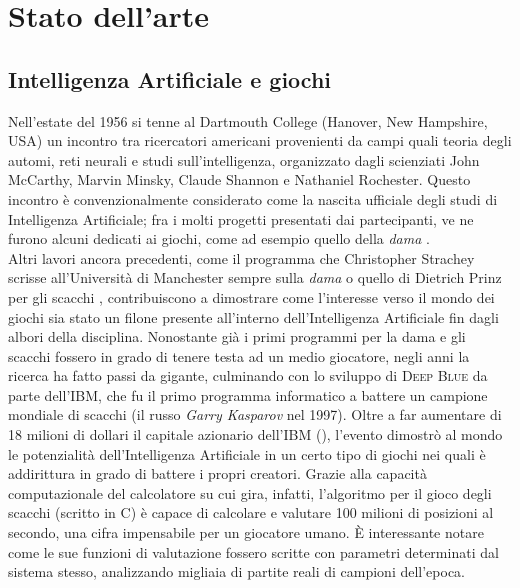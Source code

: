 \chapter*{Stato dell'arte}
\graphicspath{{Chapter2/Chapter2Figs/PNG/}{Chapter2/Chapter2Figs/PDF/}{Chapter2/Chapter2Figs/}}

\section{Intelligenza Artificiale e giochi}

Nell'estate del 1956 si tenne al Dartmouth College (Hanover, New Hampshire, USA) un incontro tra ricercatori americani provenienti da campi quali teoria degli automi, reti neurali e studi sull'intelligenza, organizzato dagli scienziati John McCarthy, Marvin Minsky, Claude Shannon e Nathaniel Rochester.
Questo incontro è convenzionalmente considerato come la nascita ufficiale degli studi di Intelligenza Artificiale; fra i molti progetti presentati dai partecipanti, ve ne furono alcuni dedicati ai giochi, come ad esempio quello della \emph{dama} \cite{randw}.\\
Altri lavori ancora precedenti, come il programma che Christopher Strachey scrisse all'Università di Manchester sempre sulla \emph{dama} o quello di Dietrich Prinz per gli scacchi \cite{historyofcomputing}, contribuiscono a dimostrare come l'interesse verso il mondo dei giochi sia stato un filone presente all'interno dell'Intelligenza Artificiale fin dagli albori della disciplina.
Nonostante già i primi programmi per la dama e gli scacchi fossero in grado di tenere testa ad un medio giocatore, negli anni la ricerca ha fatto passi da gigante, culminando con lo sviluppo di \textsc{Deep Blue} da parte dell'\textsc{IBM}, che fu il primo programma informatico a battere un campione mondiale di scacchi (il russo \emph{Garry Kasparov} nel 1997).
Oltre a far aumentare di 18 milioni di dollari il capitale azionario dell'\textsc{IBM} (\cite{randw}), l'evento dimostrò al mondo le potenzialità dell'Intelligenza Artificiale in un certo tipo di giochi nei quali è addirittura in grado di battere i propri creatori.
Grazie alla capacità computazionale del calcolatore su cui gira, infatti, l’algoritmo per il gioco degli scacchi (scritto in C) è capace di calcolare e valutare 100 milioni di posizioni al secondo, una cifra impensabile per un giocatore umano.
È interessante notare come le sue funzioni di valutazione fossero scritte con parametri determinati dal sistema stesso, analizzando migliaia di partite reali di campioni dell'epoca.\\
